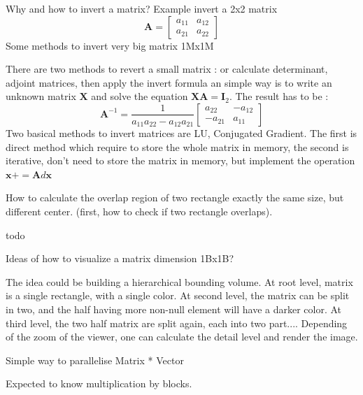 \documentclass{exam}%
\newcommand{\mathvec}[1]{\textbf{#1}}
\begin{document}
\begin{questions}
\question Why and how to invert a matrix? Example invert a 2x2 matrix 
\[
\mathvec{A}=
\left[ 
\begin{array}{cc}
a_{11} & a_{12}\\
a_{21} & a_{22}
\end{array} 
\right]
\]
Some methods to invert very big matrix 1Mx1M
\begin{solution}[.2in]
There are two methods to revert a small matrix : or calculate determinant, adjoint matrices, then apply the invert formula an simple way is to write an unknown matrix $\mathvec{X}$ and solve the equation $\mathvec{X}\mathvec{A}=\mathvec{I}_2$. The result has to be :
\[
\mathvec{A}^{-1}=
\frac{1}{a_{11}a_{22}-a_{12}a_{21}}
\left[ 
\begin{array}{cc}
a_{22} & -a_{12}\\
-a_{21} & a_{11}
\end{array} 
\right]
\]
Two basical methods to invert matrices are LU, Conjugated Gradient. The first is direct method which require to store the whole matrix in memory, the second is iterative, don't need to store the matrix in memory, but implement the operation $\mathvec{x}+=\mathvec{A}d\mathvec{x}$
\end{solution}

\question How to calculate the overlap region of two rectangle exactly the same size, but different center. (first, how to check if two rectangle overlaps).
\begin{solution}[.2in]
	todo
\end{solution}

\question Ideas of how to visualize a matrix dimension 1Bx1B?
\begin{solution}[.2in]
The idea could be building a hierarchical bounding volume. At root level, matrix is a single rectangle, with a single color. At second level, the matrix can be split in two, and the half having more non-null element will have a darker color. At third level, the two half matrix are split again, each into two part.... Depending of the zoom of the viewer, one can calculate the detail level and render the image.
\end{solution}

\question Simple way to parallelise Matrix * Vector
\begin{solution}[.2in]
Expected to know multiplication by blocks.
\end{solution}


\end{questions}
\end{document}
